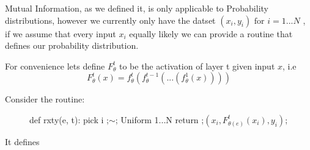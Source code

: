 Mutual Information, as we defined it, is only applicable to Probability
distributions, however we currently only have the datset 
$(x_i, y_i) \text{ for } i = 1...N$
, if we assume that every input $x_i$ equally likely we can provide a routine
that defines our probability distribution.

For convenience lets define $F_{\theta}^t$ to be the activation of layer t given
input $x$, i.e
$$F_{\theta}^t(x) = f_{\theta}^t(f_{\theta}^{t-1}(...(f_{\theta}^1(x))))$$

Consider the routine:
\begin{figure}[H]
    \begin{pythonfigure}
      def rxty(e, t):
        pick i ;$\sim$; Uniform {1...N}
        return ;$(x_i, F_{\theta(e)}^t(x_i), y_i)$;
    \end{pythonfigure}
    \label{fig:rxty}
\end{figure}
It defines











